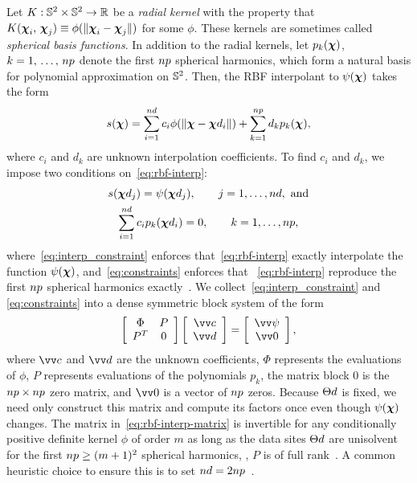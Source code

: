 Let $K:\mathbb{S}^2\times\mathbb{S}^2\to\mathbb{R}$ be a \emph{radial kernel} with the property that
$K(\boldsymbol{\chi}_i,\,\boldsymbol{\chi}_j)\equiv\phi(\|\boldsymbol{\chi}_i-\boldsymbol{\chi}_j\|)$ for some $\phi$. These kernels are
sometimes called \emph{spherical basis functions}. In addition to the radial kernels, let
$p_k(\boldsymbol{\chi})$, $k=1,\,\ldots,\,\poly\cardinality$ denote the first $\poly\cardinality$
spherical harmonics, which form a natural basis for polynomial approximation on
$\mathbb{S}^2$. Then, the RBF interpolant to $\psi(\boldsymbol{\chi})$ takes the form
\begin{equation}\label{eq:rbf-interp}
    s(\Xp)
    = \sum_{i=1}^{\data\cardinality} c_i \phi(\|\Xp-\data\Xp_i\|)
    + \sum_{k=1}^{\poly\cardinality} d_k p_k(\Xp),
\end{equation}
where $c_i$ and $d_k$ are unknown interpolation coefficients. To find $c_i$ and $d_k$, we
impose two conditions on~\eqref{eq:rbf-interp}:
\begin{gather}
    s(\data\Xp_j) = \psi(\data\Xp_j), \qquad j=1,\ldots,\data\cardinality,~\text{and} \label{eq:interp_constraint} \\
    \sum_{i=1}^{\data\cardinality} c_i p_k(\data\Xp_i) = 0, \qquad k=1,\ldots,\poly\cardinality, \label{eq:constraints}
\end{gather}
where~\eqref{eq:interp_constraint} enforces that~\eqref{eq:rbf-interp} exactly
interpolate the function $\psi(\boldsymbol{\chi})$, and~\eqref{eq:constraints} enforces that~%
\eqref{eq:rbf-interp} reproduce the first $\poly\cardinality$ spherical harmonics
exactly~\cite{Fasshauer:2007ui}. We collect~\eqref{eq:interp_constraint} and~%
\eqref{eq:constraints} into a dense symmetric block system of the form
\begin{equation}\label{eq:rbf-interp-matrix}
    \left[\begin{array}{cc}
            \Phi & P \\ P^T & 0
    \end{array}\right]\left[\begin{array}{c}
            \arr{c} \\ \arr{d}
    \end{array}\right] = \left[\begin{array}{c}
            \arr{\psi} \\ \arr{0}
    \end{array}\right],
\end{equation}
where $\arr{c}$ and $\arr{d}$ are the unknown coefficients, $\Phi$ represents the
evaluations of $\phi$, $P$ represents evaluations of the polynomials $p_k$, the matrix
block $0$ is the $\poly\cardinality\times\poly\cardinality$ zero matrix, and $\arr{0}$ is
a vector of $\poly\cardinality$ zeros. Because $\data\sites$ is fixed, we need only
construct this matrix and compute its factors once even though $\psi(\boldsymbol{\chi})$ changes. The
matrix in~\eqref{eq:rbf-interp-matrix} is invertible for any conditionally positive
definite kernel $\phi$ of order $m$ as long as the data sites $\data\sites$ are
unisolvent for the first $\poly\cardinality \ge (m+1)^2$ spherical harmonics,
, $P$ is of full rank~\cite{Fasshauer:2007ui}. A common heuristic choice to
ensure this is to set $\data\cardinality = 2 \poly\cardinality$~\cite{SWJCP2018}. 

